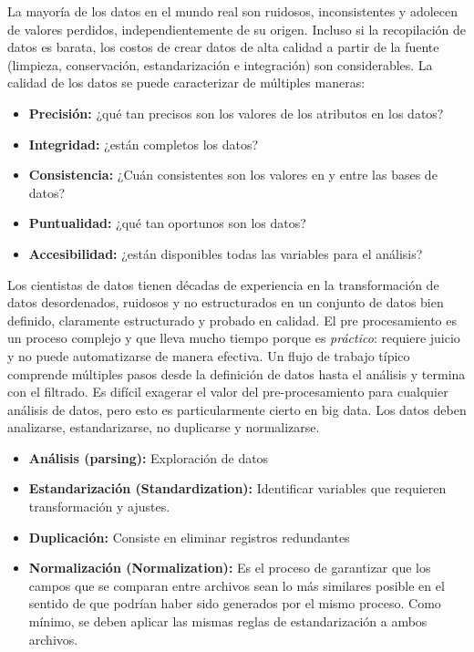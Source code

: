 \documentclass[
]{book}
\providecommand{\tightlist}{%
  \setlength{\itemsep}{0pt}\setlength{\parskip}{0pt}}
\begin{document}
La mayoría de los datos en el mundo real son ruidosos, inconsistentes y adolecen de valores perdidos, independientemente de su origen. Incluso si la recopilación de datos es barata, los costos de crear datos de alta calidad a partir de la fuente (limpieza, conservación, estandarización e integración) son considerables. La calidad de los datos se puede caracterizar de múltiples maneras:

\begin{itemize}
\tightlist
\item
  \textbf{Precisión:} ¿qué tan precisos son los valores de los atributos en los datos?
\item
  \textbf{Integridad:} ¿están completos los datos?
\item
  \textbf{Consistencia:} ¿Cuán consistentes son los valores en y entre las bases de datos?
\item
  \textbf{Puntualidad:} ¿qué tan oportunos son los datos?
\item
  \textbf{Accesibilidad:} ¿están disponibles todas las variables para el análisis?
\end{itemize}

Los cientistas de datos tienen décadas de experiencia en la transformación de datos desordenados, ruidosos y no estructurados en un conjunto de datos bien definido, claramente estructurado y probado en calidad. El pre procesamiento es un proceso complejo y que lleva mucho tiempo porque es \emph{práctico}: requiere juicio y no puede automatizarse de manera efectiva. Un flujo de trabajo típico comprende múltiples pasos desde la definición de datos hasta el análisis y termina con el filtrado. Es difícil exagerar el valor del pre-procesamiento para cualquier análisis de datos, pero esto es particularmente cierto en big data. Los datos deben analizarse, estandarizarse, no duplicarse y normalizarse.

\begin{itemize}
\tightlist
\item
  \textbf{Análisis (parsing):} Exploración de datos
\item
  \textbf{Estandarización (Standardization):} Identificar variables que requieren transformación y ajustes.
\item
  \textbf{Duplicación:} Consiste en eliminar registros redundantes
\item
  \textbf{Normalización (Normalization):} Es el proceso de garantizar que los campos que se comparan entre archivos sean lo más similares posible en el sentido de que podrían haber sido generados por el mismo proceso. Como mínimo, se deben aplicar las mismas reglas de estandarización a ambos archivos.
\end{itemize}
\end{document}
